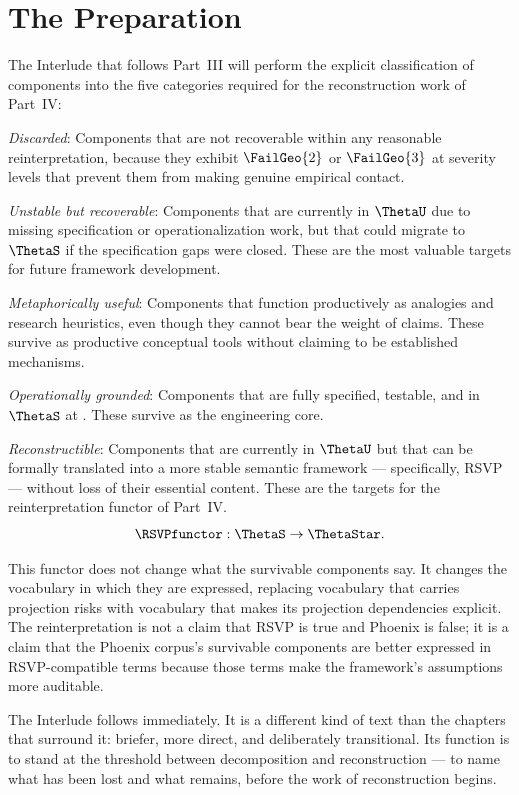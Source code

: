 \section{The Preparation}
\label{sec:preparation}

The Interlude that follows Part~III will perform the
explicit classification of components into the five
categories required for the reconstruction work of Part~IV:

\textit{Discarded}: Components that are not recoverable
within any reasonable reinterpretation, because they
exhibit $\FailGeo{2}$ or $\FailGeo{3}$ at severity
levels that prevent them from making genuine empirical
contact.

\textit{Unstable but recoverable}: Components that
are currently in $\ThetaU$ due to missing specification
or operationalization work, but that could migrate
to $\ThetaS$ if the specification gaps were closed.
These are the most valuable targets for future
framework development.

\textit{Metaphorically useful}: Components that
function productively as \LevelII{} analogies and
research heuristics, even though they cannot bear
the weight of \LevelIV{} claims. These survive as
productive conceptual tools without claiming to
be established mechanisms.

\textit{Operationally grounded}: Components that
are fully specified, testable, and in $\ThetaS$ at
\LevelI{}. These survive as the engineering core.

\textit{Reconstructible}: Components that are
currently in $\ThetaU$ but that can be formally
translated into a more stable semantic framework
--- specifically, RSVP --- without loss of their
essential content. These are the targets for the
reinterpretation functor of Part~IV.
\[
  \RSVPfunctor : \ThetaS \to \ThetaStar.
\]

This functor does not change what the survivable
components say. It changes the vocabulary in which
they are expressed, replacing vocabulary that carries
projection risks with vocabulary that makes its
projection dependencies explicit. The reinterpretation
is not a claim that RSVP is true and Phoenix is false;
it is a claim that the Phoenix corpus's survivable
components are better expressed in RSVP-compatible
terms because those terms make the framework's
assumptions more auditable.

\medskip

The Interlude follows immediately. It is a different
kind of text than the chapters that surround it:
briefer, more direct, and deliberately transitional.
Its function is to stand at the threshold between
decomposition and reconstruction --- to name what
has been lost and what remains, before the work
of reconstruction begins.

